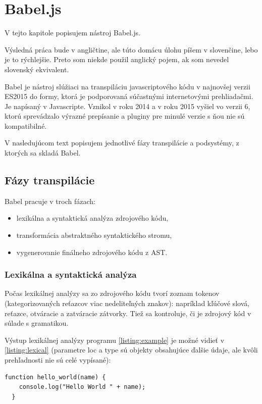\chapter{Babel.js}

\label{kap:babel} %

V tejto kapitole popisujem nástroj Babel.js.

Výsledná práca bude v angličtine, ale túto domácu úlohu píšem v slovenčine, lebo je to rýchlejšie. Preto som niekde použil anglický pojem, ak som nevedel slovenský ekvivalent.

Babel je nástroj slúžiaci na transpiláciu javascriptového kódu v najnovšej verzii ES2015 do formy, ktorá je podporovaná súčastnými internetovými prehliadačmi. Je napísaný v Javascripte. Vznikol v roku 2014 a v roku 2015 vyšiel vo verzii 6, ktorú sprevádzalo výrazné prepísanie a pluginy pre minulé verzie s ňou nie sú kompatibilné.

V nasledujúcom text popisujem jednotlivé fázy transpilácie a podsystémy, z ktorých sa skladá Babel.

\section{Fázy transpilácie}
Babel pracuje v troch fázach:
\begin{itemize}
\item lexikálna a syntaktická analýza zdrojového kódu,
\item transformácia abstraktného syntaktického stromu,
\item vygenerovanie finálneho zdrojového kódu z AST.
\end{itemize}

\subsection{Lexikálna a syntaktická analýza}
Počas lexikálnej analýzy sa zo zdrojového kódu tvorí zoznam tokenov (kategorizovaných reťazcov viac nedeliteľných znakov): napríklad kľúčové slová, reťazce, otváracie a zatváracie zátvorky. Tiež sa kontroluje, či je zdrojový kód v súlade s gramatikou.

Výstup lexikálnej analýzy programu \ref{listing:example} je možné vidieť v \ref{listing:lexical} (parametre loc a type sú objekty obsahujúce ďalšie údaje, ale kvôli prehľadnosti nie sú celé vypísané):

\begin{lstlisting}[caption=Ukážkový program,label=listing:example]
  function hello_world(name) {
	console.log("Hello World " + name);
  }
\end{lstlisting}



